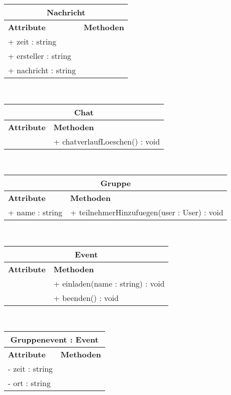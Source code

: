 \documentclass[a4paper, 12pt]{article}
\begin{document}
\begin{tabular}{ | p{5.5cm} | p{8cm} |}
\multicolumn{2}{c}{\textbf{Nachricht}}\\ \hline
\textbf{Attribute} & \textbf{Methoden} \\ \hline
+ zeit : string &  \\ \hline
+ ersteller : string &  \\ \hline
+ nachricht : string &  \\ \hline
\end{tabular}\\[1\baselineskip]

\begin{tabular}{ | p{5.5cm} | p{8cm} |}
\multicolumn{2}{c}{\textbf{Chat}}\\ \hline
\textbf{Attribute} & \textbf{Methoden} \\ \hline
 & + chatverlaufLoeschen() : void \\ \hline
\end{tabular}\\[1\baselineskip]

\begin{tabular}{ | p{5.5cm} | p{8cm} |}
\multicolumn{2}{c}{\textbf{Gruppe}}\\ \hline
\textbf{Attribute} & \textbf{Methoden} \\ \hline
+ name : string & + teilnehmerHinzufuegen(user : User) : void \\ \hline
\end{tabular}\\[1\baselineskip]

\begin{tabular}{ | p{5.5cm} | p{8cm} |}
\multicolumn{2}{c}{\textbf{Event}}\\ \hline
\textbf{Attribute} & \textbf{Methoden} \\ \hline
 & + einladen(name : string) : void \\ \hline
 & + beenden() : void \\ \hline
\end{tabular}\\[1\baselineskip]

\begin{tabular}{ | p{5.5cm} | p{8cm} |}
\multicolumn{2}{c}{\textbf{Gruppenevent : Event}}\\ \hline
\textbf{Attribute} & \textbf{Methoden} \\ \hline
- zeit : string &  \\ \hline
- ort : string &  \\ \hline
\end{tabular}\\[\baselineskip]
\end{document}

